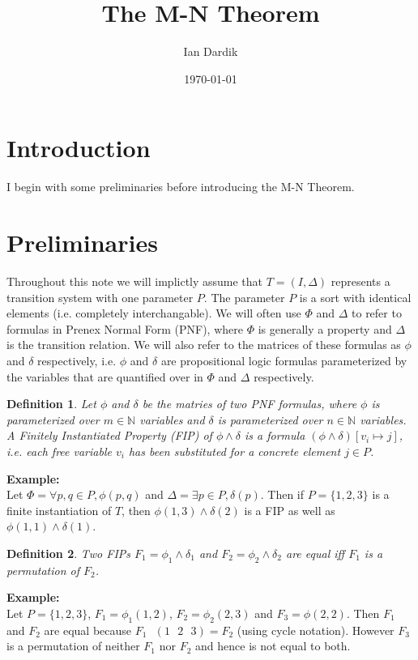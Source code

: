 \documentclass[12pt]{article}
\title{The M-N Theorem}
\author{Ian Dardik}
\date{\today}
\newtheorem{definition}{Definition}
\newcommand{\msp}{\text{ }}
\begin{document}
\maketitle

\section{Introduction}
I begin with some preliminaries before introducing the M-N Theorem.


\section{Preliminaries}
Throughout this note we will implictly assume that $T=(I,\Delta)$ represents a transition system with one parameter $P$.  The parameter $P$ is a sort with identical elements (i.e. completely interchangable).  We will often use $\Phi$ and $\Delta$ to refer to formulas in Prenex Normal Form (PNF), where $\Phi$ is generally a property and $\Delta$ is the transition relation.  We will also refer to the matrices of these formulas as $\phi$ and $\delta$ respectively, i.e. $\phi$ and $\delta$ are propositional logic formulas parameterized by the variables that are quantified over in $\Phi$ and $\Delta$ respectively.

\begin{definition}
  Let $\phi$ and $\delta$ be the matries of two PNF formulas, where $\phi$ is parameterized over $m \in \mathbb{N}$ variables and $\delta$ is parameterized over $n \in \mathbb{N}$ variables.  A Finitely Instantiated Property (FIP) of $\phi \land \delta$ is a formula $(\phi \land \delta) [v_i \mapsto j]$, i.e. each free variable $v_i$ has been substituted for a concrete element $j \in P$.  
\end{definition}

\noindent \textbf{Example:}\\
Let $\Phi = \forall p,q \in P, \phi(p,q)$ and $\Delta = \exists p \in P, \delta(p)$.  Then if $P= \{1,2,3\}$ is a finite instantiation of $T$, then $\phi(1,3) \land \delta(2)$ is a FIP as well as $\phi(1,1) \land \delta(1)$.

\begin{definition}
  Two FIPs $F_1 = \phi_1 \land \delta_1$ and $F_2 = \phi_2 \land \delta_2$ are equal iff $F_1$ is a permutation of $F_2$.
\end{definition}

\noindent \textbf{Example:}\\
Let $P=\{1,2,3\}$, $F_1 = \phi_1(1,2)$, $F_2 = \phi_2(2,3)$ and $F_3 = \phi(2,2)$.  Then $F_1$ and $F_2$ are equal because $F_1 \msp (1 \msp 2 \msp 3) = F_2$ (using cycle notation).  However $F_3$ is a permutation of neither $F_1$ nor $F_2$ and hence is not equal to both.
\end{document}

